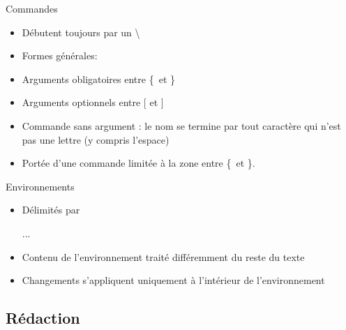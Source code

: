 \begin{frame}[fragile]{Commandes}
	\begin{itemize}
		\item Débutent toujours par un \textbackslash
		\item Formes générales:
\begin{codesource}
	\nomcommande
\end{codesource}
		\item Arguments obligatoires entre \{\ et \}
		\item Arguments optionnels entre [ et ]
		\item Commande sans argument : le nom se termine par tout caractère qui n’est pas une lettre (y
		compris l’espace)
		\item Portée d’une commande limitée à la zone entre \{\ et \}.
	\end{itemize}
\end{frame}

\begin{frame}[fragile,c]{Environnements}
	\begin{itemize}
		\item Délimités par
\begin{codesource}
	\begin{environnement}
		...
	\end{environnement}
\end{codesource}
		\item Contenu de l’environnement traité différemment du reste du texte
		\item Changements s’appliquent uniquement à l’intérieur de l’environnement
	\end{itemize}
\end{frame}

\subsection{Rédaction}